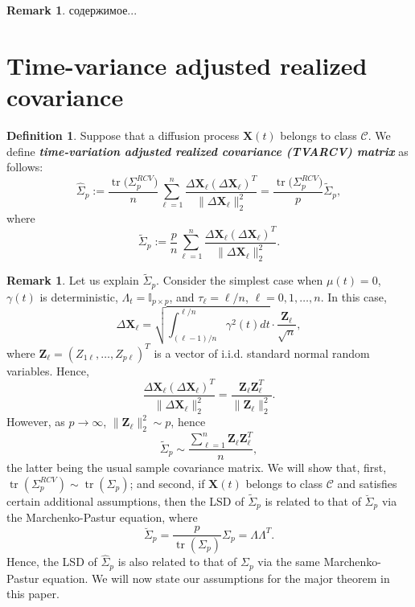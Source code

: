\documentclass[a4paper,11pt]{article}
\theoremstyle{plain}
\theoremstyle{definition}
\newtheorem{defn}[thm]{Definition}
\newtheorem{rmrk}[thm]{Remark}
\newcommand{\tr}{\operatorname{tr}}
\newcommand{\define}[1]{\textit{\textbf{#1}}}
\begin{document}
    \begin{rmrk}
    	содержимое...
    \end{rmrk}
    
    \section*{Time-variance adjusted realized covariance}
    		
    \begin{defn}
   		Suppose that a diffusion process $\mathbf{X}(t)$ belongs to class $\mathcal{C}$. We define \define{time-variation adjusted realized covariance (TVARCV) matrix} as follows:
   		\begin{equation} \label{TVARCV}
   		\widehat{\Sigma}_p := \frac{\tr \big( \Sigma_p^{RCV} \big) }{n} \sum_{\ell = 1}^{n} \frac{\Delta \mathbf{X}_\ell (\Delta \mathbf{X}_\ell)^T}{\| \Delta \mathbf{X}_\ell \|_2^2} = \frac{\tr \big( \Sigma_p^{RCV} \big) }{p} \widetilde{\Sigma}_p,
   		\end{equation}
   		where
   		\begin{equation} \label{Sigma_tilde}
   		\widetilde{\Sigma}_p := \frac{p}{n} \sum_{\ell = 1}^{n} \frac{\Delta \mathbf{X}_\ell (\Delta \mathbf{X}_\ell)^T}{\| \Delta \mathbf{X}_\ell \|_2^2}.
   		\end{equation}
    \end{defn}
    
    \begin{rmrk}
    	Let us explain $\widetilde{\Sigma}_p$. Consider the simplest case when $\mu(t) = 0$, $\gamma(t)$ is deterministic, $\Lambda_t = \mathbb{I}_{p \times p}$, and $\tau_{\ell} = \ell / n$, $\ell = 0, 1, \dots, n$. In this case,
    	\[ \Delta \mathbf{X}_\ell = \sqrt{\int_{(\ell - 1)/n}^{\ell / n} \gamma^2(t) dt }\cdot \frac{\mathbf{Z}_\ell}{\sqrt{n}}, \]
    	where $\mathbf{Z}_\ell = (Z_{1\ell}, \dots, Z_{p\ell})^T$ is a vector of i.i.d. standard normal random variables. Hence,
    	\[ \frac{\Delta \mathbf{X}_\ell (\Delta \mathbf{X}_\ell)^T}{\| \Delta \mathbf{X}_\ell \|_2^2} = \frac{\mathbf{Z}_\ell \mathbf{Z}_\ell^T}{\|  \mathbf{Z}_\ell \|_2^2}. \]
    	However, as $p \rightarrow \infty$, $\| \mathbf{Z}_\ell \|_2^2 \sim p$, hence
    	\[ \widetilde{\Sigma}_p \sim \frac{\sum_{\ell = 1}^{n}\mathbf{Z}_\ell \mathbf{Z}_\ell^T}{n}, \]
    	the latter being the usual sample covariance matrix.
    	We will show that, first, $\tr(\Sigma_p^{RCV}) \sim \tr(\Sigma_p)$; and second, if $\mathbf{X}(t)$ belongs to class $\mathcal{C}$ and satisfies certain additional assumptions, then the LSD of $\widetilde{\Sigma}_p$ is related to that of $\breve{\Sigma}_p$ via the Marchenko-Pastur equation, where
    	\[ \breve{\Sigma}_p = \frac{p}{\tr(\Sigma_p)}\Sigma_p = \Lambda \Lambda^T. \]
    	Hence, the LSD of $\widehat{\Sigma}_p$ is also related to that of $\Sigma_p$ via the same Marchenko-Pastur equation.
    	We will now state our assumptions for the major theorem in this paper.
    \end{rmrk}
    
\end{document}

